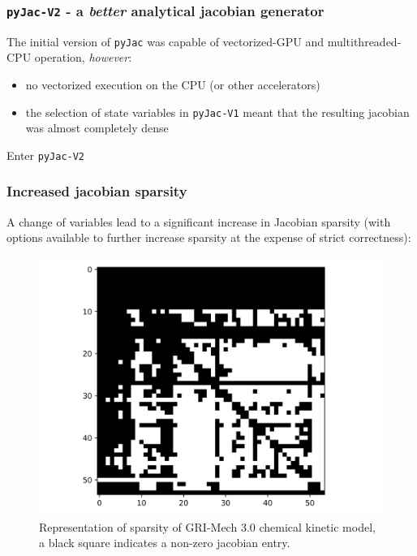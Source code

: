 \documentclass{beamer}
\begin{document}
\begin{frame}
 \frametitle{\texttt{pyJac-V2} - a \textit{better} analytical jacobian generator}
 The initial version of \texttt{pyJac} was capable of vectorized-GPU and multithreaded-CPU operation, \textit{however}:
 \begin{itemize}
  \item no vectorized execution on the CPU (or other accelerators)
  \item the selection of state variables in \texttt{pyJac-V1} meant that the resulting jacobian was almost completely dense
 \end{itemize}
 \textrightarrow Enter \texttt{pyJac-V2}
\end{frame}

\begin{frame}
\frametitle{Increased jacobian sparsity}
A change of variables lead to a significant increase in Jacobian sparsity (with options available to further increase sparsity at the expense of strict correctness):
\begin{figure}
 \includegraphics[height=0.5\textheight]{ch4_sparsity_exact.png}
 \caption{Representation of sparsity of GRI-Mech 3.0 chemical kinetic model, a black square indicates a non-zero jacobian entry.}
\end{figure}
\end{frame}
\end{document}

